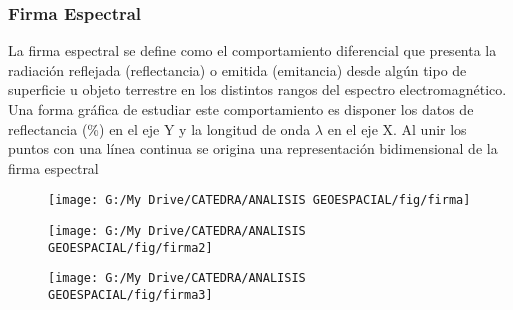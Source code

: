 \documentclass[14pt]{beamer}
\begin{document}
\begin{frame}
  \begin{figure}
    \centering
    \qquad
    \label{fig:1}
  \end{figure}
  \begin{figure}
    \centering
    \qquad    
    \label{fig:2}
  \end{figure}
\end{frame}
 \begin{frame}
\frametitle{Firma Espectral}
\scriptsize{La firma espectral se define como el comportamiento diferencial que presenta la radiación reflejada (reflectancia) o emitida (emitancia) desde algún tipo de superficie u objeto terrestre en los distintos rangos del espectro electromagnético. Una forma gráfica de estudiar este comportamiento es disponer los datos de reflectancia (\%) en el eje Y y la longitud de onda $\lambda$ en el eje X. Al unir los puntos con una línea continua se origina una representación bidimensional de la firma espectral}
 \begin{figure}
    \centering
    \texttt{[image: G:/My Drive/CATEDRA/ANALISIS GEOESPACIAL/fig/firma]}
  \end{figure}
\end{frame}
\begin{frame}
  \begin{figure}
    \centering
    \texttt{[image: G:/My Drive/CATEDRA/ANALISIS GEOESPACIAL/fig/firma2]}
  \end{figure}
\end{frame}
\begin{frame}
  \begin{figure}
    \centering
    \texttt{[image: G:/My Drive/CATEDRA/ANALISIS GEOESPACIAL/fig/firma3]}
  \end{figure}
\end{frame}
\end{document}
